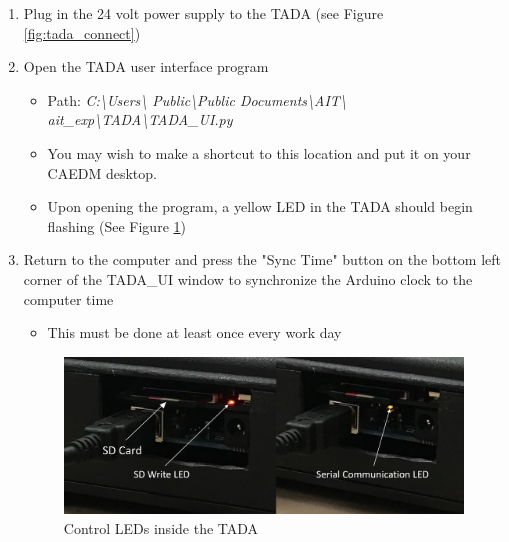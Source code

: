 \documentclass[letterpaper,11pt]{article}
\begin{document}
\begin{enumerate}
    \item Plug in the 24 volt power supply to the TADA (see Figure 
        \ref{fig:tada_connect})
    
    

    \item Open the TADA user interface program 
            \begin{itemize}
            \item Path: \textit{C:\textbackslash Users\textbackslash  
                Public\textbackslash Public Documents\textbackslash AIT\textbackslash 
                ait\_exp\textbackslash TADA\textbackslash TADA\_UI.py}
            \item You may wish to make a shortcut to this location and put it on 
                your CAEDM desktop.
            \item Upon opening the program, a yellow LED in the TADA should 
                begin flashing (See Figure \ref{fig:tada_leds}) %
            \end{itemize}

    \item Return to the computer and press the "Sync Time" button on the bottom 
        left corner of the TADA\_UI
        window to synchronize the Arduino clock to the computer time
        \begin{itemize}
        \item This must be done at least once every work day
        \end{itemize}

\begin{figure}[H]
    \centering
    \includegraphics[width=.75\textwidth]{led_red_yellow.jpg}
    \caption{Control LEDs inside the TADA}
    \label{fig:tada_leds}
\end{figure}


\end{enumerate}
\end{document}
